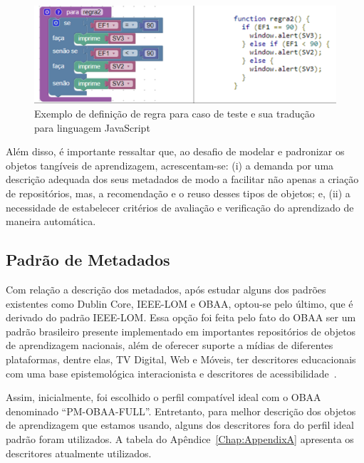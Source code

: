 \begin{figure}[ht]
	\centering
	\includegraphics[width=1\linewidth]{chapters/proposedMethod/Blockly.png}
	\caption{Exemplo de definição de regra para caso de teste e sua tradução para linguagem JavaScript}
	\label{fig:blockly_exemplo}
\end{figure}


Além disso, é importante ressaltar que, ao desafio de modelar e padronizar os objetos tangíveis de aprendizagem, acrescentam-se: (i) a demanda por uma descrição adequada dos seus metadados de modo a facilitar não apenas a criação de repositórios, mas, a recomendação e o reuso desses tipos de objetos; e, (ii) a necessidade de estabelecer critérios de avaliação e verificação do aprendizado de maneira automática.

\subsection{Padrão de Metadados}

Com relação a descrição dos metadados, após estudar alguns dos padrões existentes como Dublin Core, IEEE-LOM e OBAA, optou-se pelo último, que é derivado do padrão IEEE-LOM. Essa opção foi feita pelo fato do OBAA ser um padrão brasileiro presente implementado em importantes repositórios de objetos de aprendizagem nacionais, além de oferecer suporte a mídias de diferentes plataformas, dentre elas, TV Digital, Web e Móveis, ter descritores educacionais com uma base epistemológica interacionista e descritores de acessibilidade~\citep{vicari:2009}.

Assim, inicialmente, foi escolhido o perfil compatível ideal com o OBAA denominado ``PM-OBAA-FULL''. Entretanto, para melhor descrição dos objetos de aprendizagem que estamos usando, alguns dos descritores fora do perfil ideal padrão foram utilizados. A tabela do Apêndice~\ref{Chap:AppendixA} apresenta os descritores atualmente utilizados. 


